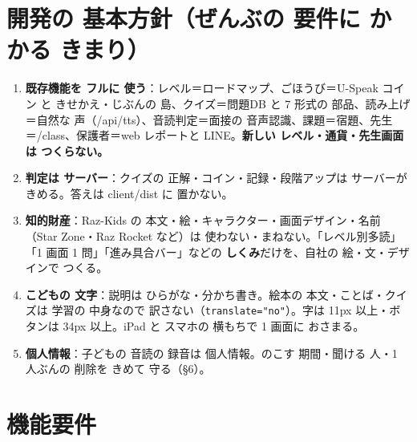 \documentclass[a4paper,10pt]{article}
\newcommand{\req}[1]{\textbf{\color{orange}#1}}
\begin{document}
\section{開発の 基本方針（ぜんぶの 要件に かかる きまり）}
\begin{enumerate}
\item \req{既存機能を フルに 使う}：レベル＝ロードマップ、ごほうび＝U-Speak コイン と きせかえ・じぶんの 島、クイズ＝問題DB と 7 形式の 部品、読み上げ＝自然な 声（/api/tts）、音読判定＝面接の 音声認識、課題＝宿題、先生＝/class、保護者＝web レポートと LINE。\textbf{新しい レベル・通貨・先生画面は つくらない。}
\item \req{判定は サーバー}：クイズの 正解・コイン・記録・段階アップは サーバーが きめる。答えは client/dist に 置かない。
\item \req{知的財産}：Raz-Kids の 本文・絵・キャラクター・画面デザイン・名前（Star Zone・Raz Rocket など）は 使わない・まねない。「レベル別多読」「1 画面 1 問」「進み具合バー」などの \textbf{しくみ}だけを、自社の 絵・文・デザインで つくる。
\item \req{こどもの 文字}：説明は ひらがな・分かち書き。絵本の 本文・ことば・クイズは 学習の 中身なので 訳さない（\texttt{translate="no"}）。字は 11px 以上・ボタンは 34px 以上。iPad と スマホの 横もちで 1 画面に おさまる。
\item \req{個人情報}：子どもの 音読の 録音は 個人情報。のこす 期間・聞ける 人・1 人ぶんの 削除を きめて 守る（§6）。
\end{enumerate}

\section{機能要件}
\end{document}

